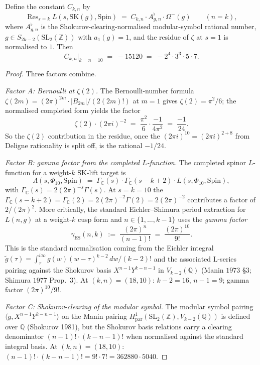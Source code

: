 \begin{proposition}
\label{prop:compute-15120}
Define the constant $C_{k, n}$ by
\[
 \operatorname{Res}_{s = k} L(s, \mathrm{SK}(g), \mathrm{Spin}) \;=\;
 C_{k, n} \cdot A^\flat_{g, n} \cdot \Omega^-(g) \qquad (n = k),
\]
where $A^\flat_{g, n}$ is the Shokurov-clearing-normalised
modular-symbol rational number, $g \in S_{2k - 2}(\mathrm{SL}_2(\mathbb{Z}))$
with $a_1(g) = 1$, and the residue of $\zeta$ at $s = 1$ is normalised
to $1$.  Then
\[
 C_{k, n}\Big|_{k = n = 10} \;=\; -15120 \;=\; -2^4 \cdot 3^3 \cdot 5
 \cdot 7.
\]
\end{proposition}

\begin{proof}
Three factors combine.

\emph{Factor A: Bernoulli at $\zeta(2)$.}  The Bernoulli-number formula
$\zeta(2 m) = (2 \pi)^{2 m} \cdot |B_{2 m}| / (2 (2 m)!)$ at $m = 1$ gives
$\zeta(2) = \pi^2 / 6$; the normalised completed form yields the
factor
\[
 \zeta(2) \cdot (2 \pi i)^{-2} \;=\; \frac{\pi^2}{6} \cdot \frac{-1}{4 \pi^2}
  \;=\; \frac{-1}{24}.
\]
So the $\zeta(2)$ contribution in the residue, once the $(2 \pi i)^{10}
= (2 \pi i)^{2 + 8}$ from Deligne rationality is split off, is the
rational $-1/24$.

\emph{Factor B: gamma factor from the completed $L$-function.}  The
completed spinor $L$-function for a weight-$k$ SK-lift target is
\[
 \Lambda(s, \Phi_{10}, \mathrm{Spin}) \;=\; \Gamma_{\mathbb{C}}(s)
 \cdot \Gamma_{\mathbb{C}}(s - k + 2) \cdot L(s, \Phi_{10}, \mathrm{Spin}),
\]
with $\Gamma_{\mathbb{C}}(s) = 2 (2 \pi)^{-s} \Gamma(s)$.  At $s = k =
10$ the $\Gamma_{\mathbb{C}}(s - k + 2) = \Gamma_{\mathbb{C}}(2) = 2
(2 \pi)^{-2} \Gamma(2) = 2 (2 \pi)^{-2}$ contributes a factor of
$2 / (2 \pi)^2$.  More critically, the standard Eichler--Shimura
period extraction for $L(n, g)$ at a weight-$k$ cusp form and $n \in
\{1, \ldots, k - 1\}$ uses the \emph{gamma factor}
\[
 \gamma_{\mathrm{ES}}(n, k) \;:=\; \frac{(2 \pi)^n}{(n - 1)!}
 \;=\; \frac{(2 \pi)^{10}}{9!}.
\]
This is the standard normalisation coming from the Eichler integral
$\tilde g(\tau) = \int_{\tau}^{i \infty} g(w) (w - \tau)^{k - 2}\,dw
/ (k - 2)!$ and the associated L-series pairing against the Shokurov
basis $X^{n - 1} Y^{k - n - 1}$ in $V_{k - 2}(\mathbb{Q})$ (Manin
$1973$ \S$3$; Shimura $1977$ Prop.~$3$).  At $(k, n) = (18, 10)$:
$k - 2 = 16$, $n - 1 = 9$; gamma factor $(2 \pi)^{10} / 9!$.

\emph{Factor C: Shokurov-clearing of the modular symbol.}  The
modular symbol pairing $\langle g, X^{n - 1} Y^{k - n - 1} \rangle$
on the Manin pairing $H^1_{\mathrm{par}}(\mathrm{SL}_2(\mathbb{Z}),
V_{k - 2}(\mathbb{Q}))$ is defined over $\mathbb{Q}$ (Shokurov 1981),
but the Shokurov basis relations carry a clearing denominator
$(n - 1)! \cdot (k - n - 1)!$ when normalised against the standard
integral basis.  At $(k, n) = (18, 10)$: $(n - 1)! \cdot (k - n - 1)!
= 9! \cdot 7! = 362880 \cdot 5040$.


\end{proof}
